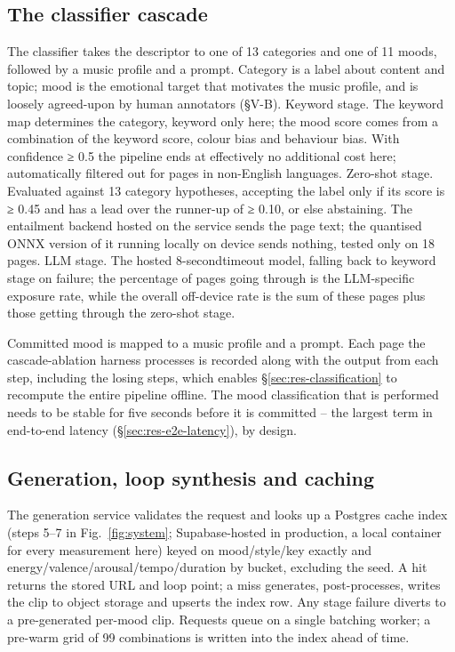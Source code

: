 \documentclass[conference]{IEEEtran}
\begin{document}
\subsection{The classifier cascade}

The classifier takes the descriptor to one of 13 categories
and one of 11 moods, followed by a music profile and a prompt.
Category is a label about content and topic; mood is the emotional
target that motivates the music profile, and is loosely agreed-upon
by human annotators (§V-B).
Keyword stage. The keyword map determines the category,
keyword only here; the mood score comes from a combination
of the keyword score, colour bias and behaviour bias. With
confidence ≥ 0.5 the pipeline ends at effectively no additional
cost here; automatically filtered out for pages in non-English languages.
Zero-shot stage. Evaluated against 13 category hypotheses,
accepting the label only if its score is ≥ 0.45 and has a lead
over the runner-up of ≥ 0.10, or else abstaining. The entailment
backend hosted on the service sends the page text; the quantised ONNX version of it running locally on device sends nothing, tested only on 18 pages. LLM stage. The hosted 8-secondtimeout model, falling back to keyword stage on failure;
the percentage of pages going through is the LLM-specific
exposure rate, while the overall off-device rate is the sum of
these pages plus those getting through the zero-shot stage.

Committed mood is mapped to a music profile and a prompt. Each page the
cascade-ablation harness processes is recorded along with the output from each
step, including the losing steps, which enables \S\ref{sec:res-classification}
to recompute the entire pipeline offline. The mood classification that is
performed needs to be stable for five seconds before it is committed -- the
largest term in end-to-end latency (\S\ref{sec:res-e2e-latency}), by design.

\subsection{Generation, loop synthesis and caching}

The generation service validates the request and looks up a Postgres
cache index (steps 5--7 in Fig.~\ref{fig:system}; Supabase-hosted in
production, a local container for every measurement here) keyed on
mood/style/key exactly and energy/valence/arousal/tempo/duration by
bucket, excluding the seed. A hit returns the stored URL and loop point;
a miss generates, post-processes, writes the clip to object storage and
upserts the index row. Any stage failure diverts to a pre-generated
per-mood clip. Requests queue on a single batching worker; a pre-warm
grid of 99 combinations is written into the index ahead of time.
\end{document}
